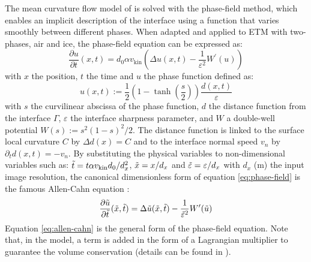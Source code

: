 \documentclass[draft,ms]{agujournal2019}
\begin{document}
The mean curvature flow model of  is solved with the phase-field method, which enables an implicit description of the interface using a function that varies smoothly between different phases. When adapted and applied to ETM with two-phases, air and ice, the phase-field equation can be expressed as:\\
\begin{equation}\label{eq:phase-field}\frac{\partial u}{\partial t}(x, t)= d_0 \alpha v_{\mathrm{kin}} \left(\Delta u(x, t)-\frac{1}{\varepsilon^{2}} W^{\prime}(u)\right)\end{equation}
\noindent with $x$ the position, $t$ the time and $u$ the phase function defined as: \begin{equation}\label{eq:phase-func}
u(x,t) := \frac{1}{2}\left(1-\tanh\left(\frac{s}{2}\right)\right)\frac{d(x,t)}{\varepsilon}
\end{equation}
with $s$ the curvilinear abscissa of the phase function, $d$ the distance function from the interface $\Gamma$, $\varepsilon$ the interface sharpness parameter, and $W$ a double-well potential $W(s):= s^{2}(1-s)^{2}/2$. The distance function is linked to the surface local curvature $C$ by $\Delta d(x) = C$ and to the interface normal speed $v_n$ by $\partial_t d (x,t) = - v_n$. By substituting the physical variables to non-dimensional variables such as: $\Tilde{t} = t \alpha v_{\mathrm{kin}} d_0 / d_x^2 $, $\Tilde{x} = x/d_x$ and $\Tilde{\varepsilon} = \varepsilon/d_x$ with $d_x$ (m) the input image resolution, the canonical dimensionless form of equation \eqref{eq:phase-field} is the famous Allen-Cahn equation \cite{bretin_and_denis_discrete-continuous_2015, kaempfer_phase-field_2009}:
\begin{equation}\label{eq:allen-cahn}\frac{\partial \Tilde{u}}{\partial \Tilde{t}}(\Tilde{x}, \Tilde{t})=\Delta \Tilde{u}(\Tilde{x}, \Tilde{t})-\frac{1}{\Tilde{\varepsilon}^{2}} W^{\prime}(\Tilde{u})\end{equation}
%
%
Equation \eqref{eq:allen-cahn} is the general form of the phase-field equation. Note that, in the model, a term is added in the form of a Lagrangian multiplier to guarantee the volume conservation (details can be found in ).
\end{document}

